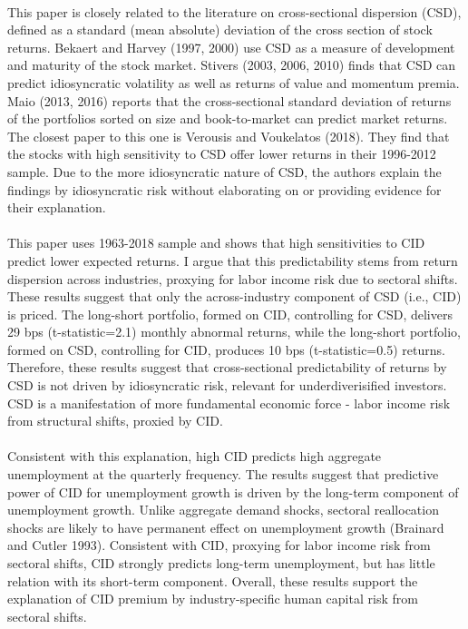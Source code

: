 \documentclass[12pt]{article}
\begin{document}
\paragraph{}
This paper is closely related to the literature on cross-sectional dispersion (CSD), defined as a standard (mean absolute) deviation of the cross section of stock returns. Bekaert and Harvey (1997, 2000) use CSD as a measure of development and maturity of the stock market. Stivers (2003, 2006, 2010) finds that CSD can predict idiosyncratic volatility as well as returns of value and momentum premia. Maio (2013, 2016) reports that the cross-sectional standard deviation of returns of the portfolios sorted on size and book-to-market can predict market returns. The closest paper to this one is Verousis and Voukelatos (2018). They find that the stocks with high sensitivity to CSD offer lower returns in their 1996-2012 sample. Due to the more idiosyncratic nature of CSD, the authors explain the findings by idiosyncratic risk without elaborating on or providing evidence for their explanation.
\paragraph{}
This paper uses 1963-2018 sample and shows that high sensitivities to CID predict lower expected returns. I argue that this predictability stems from return dispersion across industries, proxying for labor income risk due to sectoral shifts. These results suggest that only the across-industry component of CSD (i.e., CID) is priced. The long-short portfolio, formed on CID, controlling for CSD, delivers 29 bps (t-statistic=2.1) monthly abnormal returns, while the long-short portfolio, formed on CSD, controlling for CID, produces 10 bps (t-statistic=0.5) returns. Therefore, these results suggest that cross-sectional predictability of returns by CSD is not driven by idiosyncratic risk, relevant for underdiverisified investors. CSD is a manifestation of more fundamental economic force - labor income risk from structural shifts, proxied by CID. 
\paragraph{}
Consistent with this explanation, high CID predicts high aggregate unemployment at the quarterly frequency. The results suggest that predictive power of CID for unemployment growth is driven by the long-term component of unemployment growth. Unlike aggregate demand shocks, sectoral reallocation shocks are likely to have permanent effect on unemployment growth (Brainard and Cutler 1993). Consistent with CID, proxying for labor income risk from sectoral shifts, CID strongly predicts long-term unemployment, but has little relation with its short-term component.  Overall, these results support the explanation of CID premium by industry-specific human capital risk from sectoral shifts.
\end{document}
